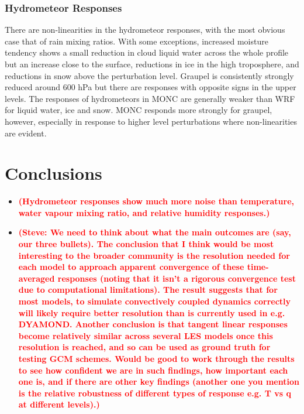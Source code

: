 \documentclass[draft]{agujournal2019}
\newcommand{\todo}[1]{\textcolor{red}{\textbf{(#1)}}}
\begin{document}
\subsubsection{Hydrometeor Responses}

There are non-linearities in the hydrometeor responses, with the most obvious
case that of rain mixing ratios. With some exceptions, increased moisture
tendency shows a small reduction in cloud liquid water across the whole profile
but an increase close to the surface, reductions in ice in the high troposphere,
and reductions in snow above the perturbation level. Graupel is consistently
strongly reduced around 600 hPa but there are responses with opposite signs in
the upper levels. The responses of hydrometeors in MONC are generally weaker
than WRF for liquid water, ice and snow. MONC responds more strongly for
graupel, however, especially in response to higher level perturbations where
non-linearities are evident.

\section{Conclusions}
\label{sec:conclusions}

\begin{itemize}
\item \todo{Hydrometeor responses show much more noise than temperature, water vapour mixing ratio, and relative humidity responses.}
\item \todo{Steve: We need to think about what the main outcomes are (say, our
three bullets).  The conclusion that I think would be most interesting to the
broader community is the resolution needed for each model to approach apparent
convergence of these time-averaged responses (noting that it isn’t a rigorous
convergence test due to computational limitations).  The result suggests that
for most models, to simulate convectively coupled dynamics correctly will likely
require better resolution than is currently used in e.g. DYAMOND. Another
conclusion is that tangent linear responses become relatively similar across
several LES models once this resolution is reached, and so can be used as ground
truth for testing GCM schemes.  Would be good to work through the results to see
how confident we are in such findings, how important each one is, and if there
are other key findings (another one you mention is the relative robustness of
different types of response e.g. T vs q at different levels).}
\end{itemize}
\end{document}
